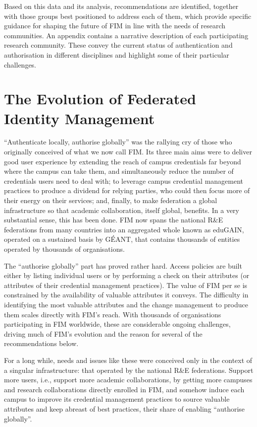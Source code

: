 \documentclass[fleqn,10pt]{wlscirep}
\begin{document}
{Based on this data and its analysis, recommendations are identified, together with those groups best positioned to address each of them, which provide specific guidance for shaping the future of FIM in line with the needs of research communities. An appendix contains a narrative description of each participating research community. These convey the current status of authentication and authorisation in different disciplines and highlight some of their particular challenges. 

\section{The Evolution of Federated Identity Management}
“Authenticate locally, authorise globally” was the rallying cry of those who originally conceived of what we now call FIM. Its three main aims were to deliver good user experience by extending the reach of campus credentials far beyond where the campus can take them, and simultaneously reduce the number of credentials users need to deal with; to leverage campus credential management practices to produce a dividend for relying parties, who could then focus more of their energy on their services; and, finally, to make federation a global infrastructure so that academic collaboration, itself global, benefits. In a very substantial sense, this has been done. FIM now spans the national R\&E federations from many countries into an aggregated whole known as eduGAIN, operated on a sustained basis by GÉANT, that contains thousands of entities operated by thousands of organisations. 

The “authorise globally” part has proved rather hard. Access policies are built either by listing individual users or by performing a check on their attributes (or attributes of their credential management practices). The value of FIM per se is constrained by the availability of valuable attributes it conveys. The difficulty in identifying the most valuable attributes and the change management to produce them scales directly with FIM’s reach. With thousands of organisations participating in FIM worldwide, these are considerable ongoing challenges, driving much of FIM’s evolution and the reason for several of the recommendations below. 

For a long while, needs and issues like these were conceived only in the context of a singular infrastructure: that operated by the national R\&E federations. Support more users, i.e., support more academic collaborations, by getting more campuses and research collaborations directly enrolled in FIM, and somehow induce each campus to improve its credential management practices to source valuable attributes and keep abreast of best practices, their share of enabling “authorise globally”. 

}
\end{document}
